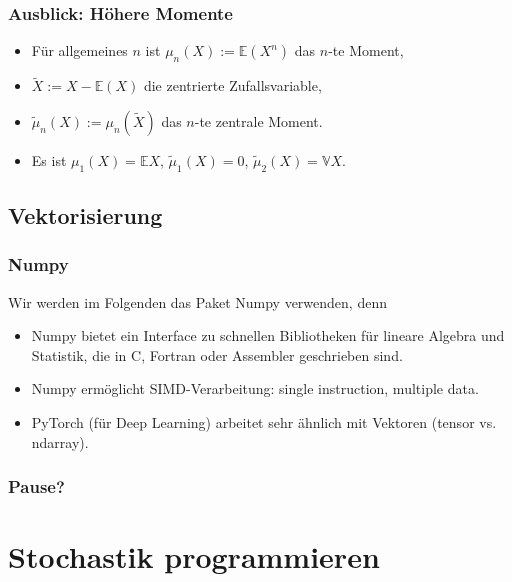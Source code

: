    \begin{frame}
    \frametitle{Ausblick: Höhere Momente}
\begin{itemize}[<+->]
\item Für allgemeines $n$ ist $\mu_n(X) := \mathbb{E}\left( X^n \right)$ das \alert{$n$-te Moment},
 \item $\tilde{X} := X - \mathbb{E}(X)$ die \alert{zentrierte Zufallsvariable},
 \item  $\tilde{\mu}_n(X) := \mu_n(\tilde{X})$ das \alert{$n$-te zentrale Moment}.
   \item Es ist $\mu_1(X)=\mathbb{E}X$, $\tilde{\mu}_1(X) = 0$, $\tilde{\mu}_2(X) = \mathbb{V}X$.
\end{itemize}
\end{frame}


\subsection{Vektorisierung}

\begin{frame}
  \frametitle{Numpy}
  Wir werden im Folgenden das Paket Numpy verwenden, denn
  \begin{itemize}[<+->]
  \item Numpy bietet ein Interface zu schnellen Bibliotheken für lineare Algebra und Statistik, die in C, Fortran oder Assembler geschrieben sind.
  \item Numpy ermöglicht \alert{SIMD}-Verarbeitung: \alert{single instruction, multiple data}.\\
    \item PyTorch (für Deep Learning) arbeitet sehr ähnlich mit Vektoren (tensor vs. ndarray).
    \end{itemize}
\end{frame}


\begin{frame}[separator]
  \frametitle{Pause?}
\end{frame}


\section{Stochastik programmieren}

